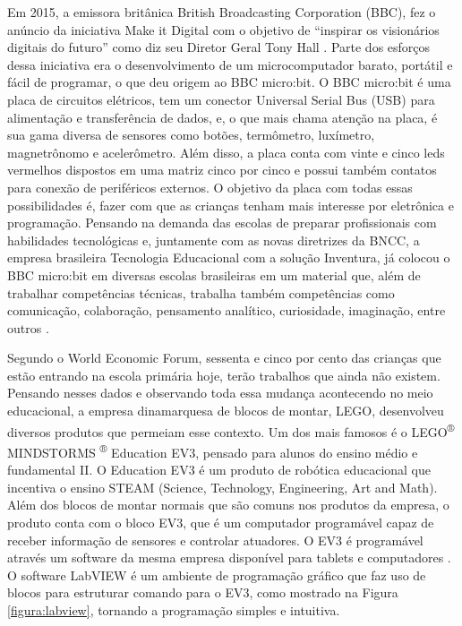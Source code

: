 Em 2015, a emissora britânica British Broadcasting Corporation (BBC), fez o anúncio da iniciativa Make it Digital com o objetivo de “inspirar os visionários digitais do futuro” como diz seu Diretor Geral Tony Hall \cite{te_2017}. Parte dos esforços dessa iniciativa era o desenvolvimento de um microcomputador barato, portátil e fácil de programar, o que deu origem ao BBC micro:bit. O BBC micro:bit é uma placa de circuitos elétricos, tem um conector Universal Serial Bus (USB) para alimentação e transferência de dados, e, o que mais chama atenção na placa, é sua gama diversa de sensores como botões, termômetro, luxímetro, magnetrônomo e acelerômetro. Além disso, a placa conta com vinte e cinco leds vermelhos dispostos em uma matriz cinco por cinco e possui também contatos para conexão de periféricos externos. O objetivo da placa com todas essas possibilidades é, fazer com que as crianças tenham mais interesse por eletrônica e programação. Pensando na demanda das escolas de preparar profissionais com habilidades tecnológicas e, juntamente com as novas diretrizes da BNCC, a empresa brasileira Tecnologia Educacional com a solução Inventura, já colocou o BBC micro:bit em diversas escolas brasileiras em um material que, além de trabalhar competências técnicas, trabalha também competências como comunicação, colaboração, pensamento analítico, curiosidade, imaginação, entre outros \cite{about_microbit}. 

Segundo o World Economic Forum, sessenta e cinco por cento das crianças que estão entrando na escola primária hoje, terão trabalhos que ainda não existem. Pensando  nesses dados e observando toda essa mudança acontecendo no meio educacional, a empresa dinamarquesa de blocos de montar, LEGO, desenvolveu diversos produtos que permeiam esse contexto. Um dos mais famosos é o LEGO\textsuperscript{®} MINDSTORMS \textsuperscript{®} Education EV3, pensado para alunos do ensino médio e fundamental II. O Education EV3 é um produto de robótica educacional que incentiva o ensino STEAM (Science, Technology, Engineering, Art and Math). Além dos blocos de montar normais que são comuns nos produtos da empresa, o produto conta com o bloco EV3, que é um computador programável capaz de receber informação de sensores e controlar atuadores. O EV3 é programável através um software da mesma empresa disponível para tablets e computadores \cite{lego_mindstorms}. O software LabVIEW é um ambiente de programação gráfico que faz uso de blocos para estruturar comando para o EV3, como mostrado na Figura \ref{figura:labview}, tornando a programação simples e intuitiva. 

